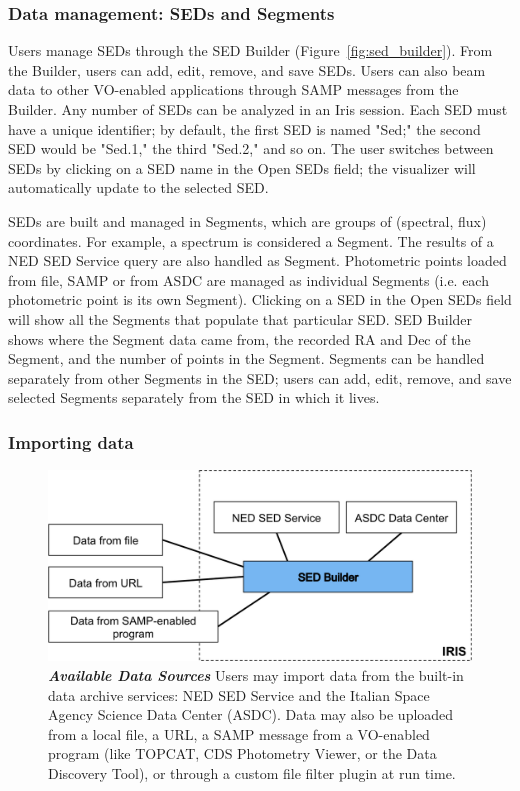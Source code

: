 \documentclass[5p]{elsarticle}
\begin{document}
\subsubsection{Data management: SEDs and Segments}
Users manage SEDs through the SED Builder (Figure~\ref{fig:sed_builder}). From the Builder, users can add, edit, remove, and save SEDs. Users can also beam data to other VO-enabled applications through SAMP messages from the Builder. Any number of SEDs can be analyzed in an Iris session. Each SED must have a unique identifier; by default, the first SED is named "Sed;" the second SED would be "Sed.1," the third "Sed.2," and so on. The user switches between SEDs by clicking on a SED name in the Open SEDs field; the visualizer will automatically update to the selected SED. 

SEDs are built and managed in Segments, which are groups of (spectral, flux) coordinates. For example, a spectrum is considered a Segment. The results of a NED SED Service query are also handled as Segment. Photometric points loaded from file, SAMP or from ASDC are managed as individual Segments (i.e. each photometric point is its own Segment). Clicking on a SED in the Open SEDs field will show all the Segments that populate that particular SED. SED Builder shows where the Segment data came from, the recorded RA and Dec of the Segment, and the number of points in the Segment. Segments can be handled separately from other Segments in the SED; users can add, edit, remove, and save selected Segments separately from the SED in which it lives. 

\subsubsection{Importing data}

\begin{figure}
\begin{center}
\includegraphics[width=\columnwidth]{figures/iris_data_sources2.png}
\caption{\textit{\textbf{\label{fig:data_sources} Available Data Sources}}\textit{}\textbf{}\textit{} Users may import data from the built-in data archive services: NED SED Service and the Italian Space Agency Science Data Center (ASDC). Data may also be uploaded from a local file, a URL, a SAMP message from a VO-enabled program (like TOPCAT, CDS Photometry Viewer, or the Data Discovery Tool), or through a custom file filter plugin at run time.}
\end{center}
\end{figure}
\end{document}
